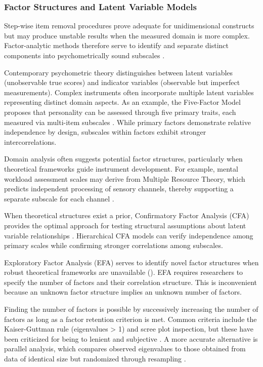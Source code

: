 \documentclass[
  authoryear,
  review]{elsarticle}
\begin{document}
\subsubsection{Factor Structures and Latent Variable
Models}\label{factor-structures-and-latent-variable-models}

Step-wise item removal procedures prove adequate for unidimensional
constructs but may produce unstable results when the measured domain is
more complex. Factor-analytic methods therefore serve to identify and
separate distinct components into psychometrically sound subscales
\citep{Fabrigar1999}.

Contemporary psychometric theory distinguishes between latent variables
(unobservable true scores) and indicator variables (observable but
imperfect measurements). Complex instruments often incorporate multiple
latent variables representing distinct domain aspects. As an example,
the Five-Factor Model proposes that personality can be assessed through
five primary traits, each measured via multi-item subscales
\citep{McAdams1992}. While primary factors demonstrate relative
independence by design, subscales within factors exhibit stronger
intercorrelations.

Domain analysis often suggests potential factor structures, particularly
when theoretical frameworks guide instrument development. For example,
mental workload assessment scales may derive from Multiple Resource
Theory, which predicts independent processing of sensory channels,
thereby supporting a separate subscale for each channel
\citep{Wickens2002}.

When theoretical structures exist a prior, Confirmatory Factor Analysis
(CFA) provides the optimal approach for testing structural assumptions
about latent variable relationships \citep{Brown2015}. Hierarchical CFA
models can verify independence among primary scales while confirming
stronger correlations among subscales.

Exploratory Factor Analysis (EFA) serves to identify novel factor
structures when robust theoretical frameworks are unavailable
(\citet{Costello2005}). EFA requires researchers to specify the number
of factors and their correlation structure. This is inconvenient because
an unknown factor structure implies an unknown number of factors.

Finding the number of factors is possible by successively increasing the
number of factors as long as a factor retention criterion is met. Common
criteria include the Kaiser-Guttman rule (eigenvalues \textgreater{} 1)
and scree plot inspection, but these have been criticized for being to
lenient and subjective \citep{Hayton2004}. A more accurate alternative
is parallel analysis, which compares observed eigenvalues to those
obtained from data of identical size but randomized through resampling
\citep{Lim2019}.
\end{document}
